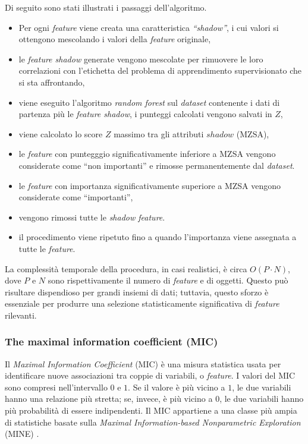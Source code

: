 \documentclass[12pt,italian]{report}
\begin{document}
	Di seguito sono stati illustrati i passaggi dell'algoritmo.
	\begin{itemize}
		\item Per ogni \textit{feature} viene creata una caratteristica \textit{``shadow''}, i cui valori si ottengono mescolando i valori della \textit{feature} originale,
		\item le \textit{feature shadow} generate vengono mescolate per rimuovere le loro correlazioni con l'etichetta del problema di apprendimento supervisionato che si sta affrontando,
		\item viene eseguito l'algoritmo \textit{random forest} sul \textit{dataset} contenente i dati di partenza più le \textit{feature shadow}, i punteggi calcolati vengono salvati in $Z$,
		\item viene calcolato lo score $Z$ massimo tra gli attributi $shadow$ (MZSA),
		\item le \textit{feature} con puntegggio significativamente inferiore a MZSA vengono considerate come ``non importanti'' e rimosse permanentemente dal \textit{dataset}.
		\item le \textit{feature} con importanza significativamente superiore a MZSA vengono considerate come ``importanti'',
		\item vengono rimossi tutte le \textit{shadow feature}.
		\item il procedimento viene ripetuto fino a quando l'importanza viene assegnata a tutte le \textit{feature}.
	\end{itemize}
	La complessità temporale della procedura, in casi realistici, è circa $O(P \cdot  N )$, dove $P$ e $N$ sono rispettivamente il numero di \textit{feature} e di oggetti. Questo può risultare dispendioso per grandi insiemi di dati; tuttavia, questo sforzo è essenziale per produrre una selezione statisticamente significativa di \textit{feature} rilevanti.
	
	\subsubsection{The maximal information coefficient (MIC)}
	Il \textit{Maximal Information Coefficient} (MIC) è una misura statistica usata per identificare nuove associazioni tra coppie di variabili, o \textit{feature}. I valori del MIC sono compresi nell'intervallo $0$ e $1$. Se il valore è più vicino a $1$, le due variabili hanno una relazione più stretta; se, invece, è più vicino a $0$, le due variabili hanno più probabilità di essere indipendenti. Il MIC appartiene a una classe più ampia di statistiche basate sulla \textit{Maximal Information-based Nonparametric Exploration} (MINE) \cite{Hu2016-ji}.
\end{document}

